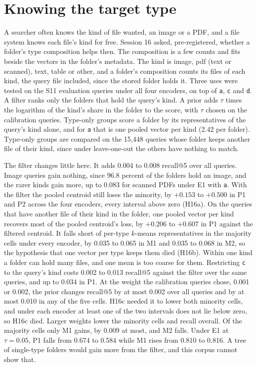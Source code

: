 \documentclass[11pt]{article}
\newcommand{\rep}[1]{\texttt{#1}}
\begin{document}
\section{Knowing the target type}
\label{sec:type}

A searcher often knows the kind of file wanted, an image or a PDF, and a file system knows each file's kind for free. Session 16 asked, pre-registered, whether a folder's type composition helps then. The composition is a few counts and fits beside the vectors in the folder's metadata. The kind is image, pdf (text or scanned), text, table or other, and a folder's composition counts its files of each kind, the query file included, since the stored folder holds it. Three uses were tested on the S11 evaluation queries under all four encoders, on top of \rep{a}, \rep{c} and \rep{d}. A filter ranks only the folders that hold the query's kind. A prior adds $\tau$ times the logarithm of the kind's share in the folder to the score, with $\tau$ chosen on the calibration queries. Type-only groups score a folder by its representatives of the query's kind alone, and for \rep{a} that is one pooled vector per kind (2.42 per folder). Type-only groups are compared on the 15,448 queries whose folder keeps another file of their kind, since under leave-one-out the others have nothing to match.

The filter changes little here. It adds 0.004 to 0.008 recall@5 over all queries. Image queries gain nothing, since 96.8 percent of the folders hold an image, and the rarer kinds gain more, up to 0.083 for scanned PDFs under E1 with \rep{a}. With the filter the pooled centroid still loses the minority, by $+0.153$ to $+0.500$ in P1 and P2 across the four encoders, every interval above zero (H16a). On the queries that have another file of their kind in the folder, one pooled vector per kind recovers most of the pooled centroid's loss, by $+0.206$ to $+0.607$ in P1 against the filtered centroid. It falls short of per-type $k$-means representatives in the majority cells under every encoder, by 0.035 to 0.065 in M1 and 0.035 to 0.068 in M2, so the hypothesis that one vector per type keeps them died (H16b). Within one kind a folder can hold many files, and one mean is too coarse for them. Restricting \rep{c} to the query's kind costs 0.002 to 0.013 recall@5 against the filter over the same queries, and up to 0.034 in P1. At the weight the calibration queries chose, 0.001 or 0.002, the prior changes recall@5 by at most 0.002 over all queries and by at most 0.010 in any of the five cells. H16c needed it to lower both minority cells, and under each encoder at least one of the two intervals does not lie below zero, so H16c died. Larger weights lower the minority cells and recall overall. Of the majority cells only M1 gains, by 0.009 at most, and M2 falls. Under E1 at $\tau = 0.05$, P1 falls from 0.674 to 0.584 while M1 rises from 0.810 to 0.816. A tree of single-type folders would gain more from the filter, and this corpus cannot show that.
\end{document}
